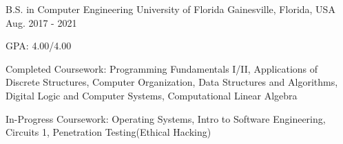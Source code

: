 

\begin{cventries}

  \cventry
    {B.S. in Computer Engineering} %
    {University of Florida} %
    {Gainesville, Florida, USA} %
    {Aug. 2017 - 2021} %
    {
      \begin{cvitems} %
        \item {GPA: 4.00/4.00}
        \item {Completed Coursework: Programming Fundamentals I/II, Applications of Discrete Structures, Computer Organization, Data Structures and Algorithms, Digital Logic and Computer Systems, Computational Linear Algebra}
        \item {In-Progress Coursework: Operating Systems, Intro to Software Engineering, Circuits 1, Penetration Testing(Ethical Hacking)}
      \end{cvitems}
    }

\end{cventries}
